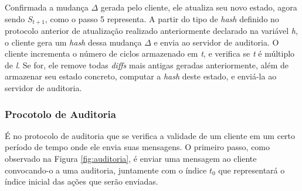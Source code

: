 Confirmada a mudança $\Delta$ gerada pelo cliente, ele atualiza seu novo estado, agora sendo $S_{t+1}$, como o passo 5 representa. A partir do tipo de \textit{hash} definido no protocolo anterior de atualização realizado anteriormente declarado na variável \textit{h}, o cliente gera um \textit{hash} dessa mudança $\Delta$ e envia ao servidor de auditoria. O cliente incrementa o número de ciclos armazenado em \textit{t}, e verifica se \textit{t} é múltiplo de \textit{l}. Se for, ele remove todas \textit{diffs} mais antigas geradas anteriormente, além de armazenar seu estado concreto, computar a \textit{hash} deste estado, e enviá-la ao servidor de auditoria.

\subsubsection{Procotolo de Auditoria}
\label{protocoloAuditoria}

É no protocolo de auditoria que se verifica a validade de um cliente em um certo período de tempo onde ele envia suas mensagens. O primeiro passo, como observado na Figura \ref{fig:auditoria}, é enviar uma mensagem ao cliente convocando-o a uma auditoria, juntamente com o índice $t_0$ que representará o índice inicial das ações que serão enviadas.

